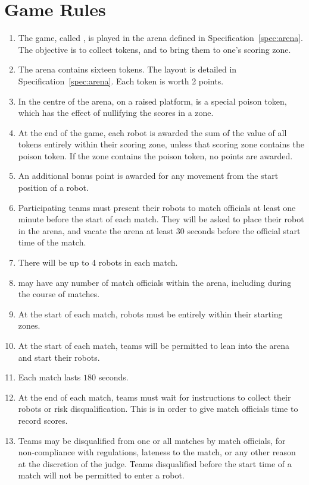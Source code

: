 \section{Game Rules}
\label{sec:rules}

\begin{enumerate}
  \item The game, called \emph{\gamename}, is played in the arena defined in
        Specification~\ref{spec:arena}. The objective is to collect tokens, and
        to bring them to one's scoring zone.
  \item The arena contains sixteen tokens. The layout is detailed in
        Specification~\ref{spec:arena}. Each token is worth 2 points.
  \item In the centre of the arena, on a raised platform, is a special poison
        token, which has the effect of nullifying the scores in a zone.
  \item At the end of the game, each robot is awarded the sum of the value of
        all tokens entirely within their scoring zone, unless that scoring zone
        contains the poison token. If the zone contains the poison token, no
        points are awarded.
  \item An additional bonus point is awarded for any movement from the start
        position of a robot.
  \item Participating teams must present their robots to match officials at
        least one minute before the start of each match. They will be asked to
        place their robot in the arena, and vacate the arena at least 30 seconds
        before the official start time of the match.
  \item There will be up to 4 robots in each match.
  \item \org may have any number of match officials within the arena, including
        during the course of matches.
  \item At the start of each match, robots must be entirely within their
        starting zones.
  \item At the start of each match, teams will be permitted to lean into the
        arena and start their robots.
  \item Each match lasts $180$ seconds.
  \item At the end of each match, teams must wait for instructions to collect
        their robots or risk disqualification. This is in order to give match
        officials time to record scores.
  \item Teams may be disqualified from one or all matches by match officials,
        for non-compliance with regulations, lateness to the match, or any other
        reason at the discretion of the judge. Teams disqualified before the
        start time of a match will not be permitted to enter a robot.
\end{enumerate}

